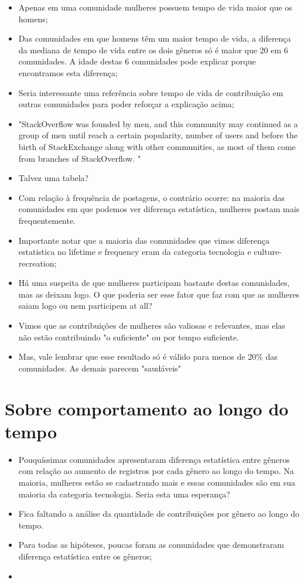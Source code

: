 \begin{itemize}
	\item Apenas em uma comunidade mulheres possuem tempo de vida maior que os homens;
	\item Das comunidades em que homens têm um maior tempo de vida, a diferença da mediana de tempo de vida entre os dois gêneros só é maior que 20 em 6 comunidades. A idade destas 6 comunidades pode explicar porque encontramos esta diferença;
	\item Seria interessante uma referência sobre tempo de vida de contribuição em outras comunidades para poder reforçar a explicação acima;
	\item "StackOverflow was founded by men, and this community may continued as a group of men until reach a certain popularity, number of users and before the birth of StackExchange along with other communities, as most of them come from branches of StackOverflow. "
	\item Talvez uma tabela?
	\item Com relação à frequência de postagens, o contrário ocorre: na maioria das comunidades em que podemos ver diferença estatística, mulheres postam mais frequentemente. 
	\item Importante notar que a maioria das comunidades que vimos diferença estatistica no lifetime e frequency eram da categoria tecnologia e culture-recreation;
	\item Há uma suspeita de que mulheres participam bastante destas comunidades, mas as deixam logo. O que poderia ser esse fator que faz com que as mulheres saiam logo ou nem participem at all? 
	\item Vimos que as contribuições de mulheres são valiosas e relevantes, mas elas não estão contribuindo "o suficiente" ou por tempo suficiente.
	\item Mas, vale lembrar que esse resultado só é válido para menos de 20\% das comunidades. As demais parecem "saudáveis"
\end{itemize}

\section{Sobre comportamento ao longo do tempo}

\begin{itemize}
	\item Pouquíssimas comunidades apresentaram diferença estatística entre gêneros com relação ao aumento de registros por cada gênero ao longo do tempo. Na maioria, mulheres estão se cadastrando mais e essas comunidades são em sua maioria da categoria tecnologia. Seria esta uma esperança?
	\item Fica faltando a análise da quantidade de contribuições por gênero ao longo do tempo.
\end{itemize}

\begin{itemize}
	\item Para todas as hipóteses, poucas foram as comunidades que demonstraram diferença estatística entre os gêneros;
	\item 
\end{itemize}